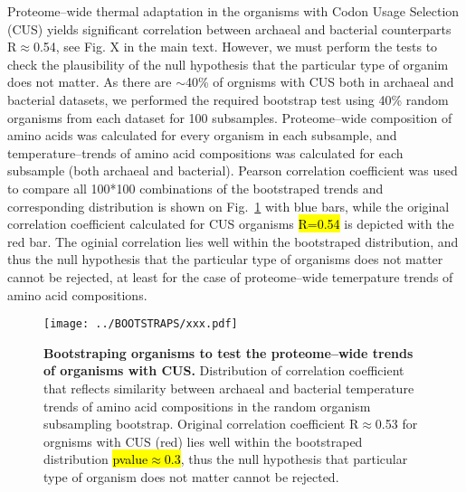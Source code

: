 \documentclass{report}
\begin{document}
Proteome--wide thermal adaptation in the organisms with Codon Usage Selection (CUS) yields significant correlation between archaeal and bacterial counterparts R$\approx$0.54, see Fig. X in the main text. However, we must perform the tests to check the plausibility of the null hypothesis that the particular type of organim does not matter. As there are $\sim$40\% of orgnisms with CUS both in archaeal and bacterial datasets, we performed the required bootstrap test using 40\% random organisms from each dataset for 100 subsamples. Proteome--wide composition of amino acids was calculated for every organism in each subsample, and temperature--trends of amino acid compositions was calculated for each subsample (both archaeal and bacterial). Pearson correlation coefficient was used to compare all 100*100 combinations of the bootstraped trends and corresponding distribution is shown on Fig.~\ref{fig2} with blue bars, while the original correlation coefficient calculated for CUS organisms \hl{R=0.54} is depicted with the red bar. The oginial correlation lies well within the bootstraped distribution, and thus the null hypothesis that the particular type of organisms does not matter cannot be rejected, at least for the case of proteome--wide temerpature trends of amino acid compositions.
\begin{figure}[h!]
	\centering
	\texttt{[image: ../BOOTSTRAPS/xxx.pdf]}
	\caption{
	{\bf Bootstraping organisms to test the proteome--wide trends of organisms with CUS.}
	Distribution of correlation coefficient that reflects similarity between archaeal and bacterial temperature trends of amino acid compositions in the random organism subsampling bootstrap. Original correlation coefficient R$\approx$0.53 for orgnisms with CUS (red) lies well within the bootstraped distribution \hl{pvalue$\approx$0.3}, thus the null hypothesis that particular type of organism does not matter cannot be rejected.
	}
	\label{fig2}
\end{figure}
\end{document}
